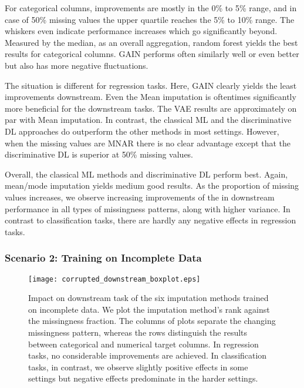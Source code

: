 For categorical columns, improvements are mostly in the 0\% to 5\% range, and in case of 50\% missing values the upper quartile reaches the 5\% to 10\% range. The whiskers even indicate performance increases which go significantly beyond. Measured by the median, as an overall aggregation, random forest yields the best results for categorical columns. GAIN performs often similarly well or even better but also has more negative fluctuations.

The situation is different for regression tasks. Here, GAIN clearly yields the least improvements downstream. Even the Mean imputation is oftentimes significantly more beneficial for the downstream tasks. The VAE results are approximately on par with Mean imputation. In contrast, the classical ML and the discriminative DL approaches do outperform the other methods in most settings. However, when the missing values are MNAR there is no clear advantage except that the discriminative DL is superior at 50\% missing values.

Overall, the classical ML methods and discriminative DL perform best. Again, mean/mode imputation yields medium good results. As the proportion of missing values increases, we observe increasing improvements of the in downstream performance in all types of missingness patterns, along with higher variance. In contrast to classification tasks, there are hardly any negative effects in regression tasks.


\subsubsection{Scenario 2: Training on Incomplete Data}

\begin{figure}\centering
	\texttt{[image: corrupted\_downstream\_boxplot.eps]}

	\caption[Downstream Ranks - Corrupted]{Impact on downstream task of the six imputation methods trained on incomplete data. We plot the imputation method's rank against the missingness fraction. The columns of plots separate the changing missingness pattern, whereas the rows distinguish the results between categorical and numerical target columns. In regression tasks, no considerable improvements are achieved. In classification tasks, in contrast, we observe slightly positive effects in some settings but negative effects predominate in the harder settings.
    }
	\label{fig:corrupted_downstream_boxplot}
\end{figure}

